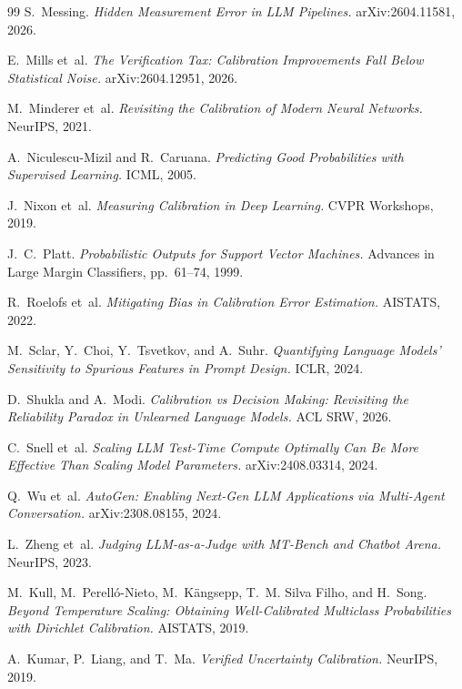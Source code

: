 \documentclass[11pt]{article}
\begin{document}
\begin{thebibliography}{99}
 S.~Messing.
\newblock \textit{Hidden Measurement Error in LLM Pipelines.}
\newblock arXiv:2604.11581, 2026.

 E.~Mills et~al.
\newblock \textit{The Verification Tax: Calibration Improvements Fall Below Statistical Noise.}
\newblock arXiv:2604.12951, 2026.

 M.~Minderer et~al.
\newblock \textit{Revisiting the Calibration of Modern Neural Networks.}
\newblock NeurIPS, 2021.

 A.~Niculescu-Mizil and R.~Caruana.
\newblock \textit{Predicting Good Probabilities with Supervised Learning.}
\newblock ICML, 2005.

 J.~Nixon et~al.
\newblock \textit{Measuring Calibration in Deep Learning.}
\newblock CVPR Workshops, 2019.

 J.~C.~Platt.
\newblock \textit{Probabilistic Outputs for Support Vector Machines.}
\newblock Advances in Large Margin Classifiers, pp.~61--74, 1999.

 R.~Roelofs et~al.
\newblock \textit{Mitigating Bias in Calibration Error Estimation.}
\newblock AISTATS, 2022.

 M.~Sclar, Y.~Choi, Y.~Tsvetkov, and A.~Suhr.
\newblock \textit{Quantifying Language Models' Sensitivity to Spurious Features in Prompt Design.}
\newblock ICLR, 2024.

 D.~Shukla and A.~Modi.
\newblock \textit{Calibration vs Decision Making: Revisiting the Reliability Paradox in Unlearned Language Models.}
\newblock ACL SRW, 2026.

 C.~Snell et~al.
\newblock \textit{Scaling LLM Test-Time Compute Optimally Can Be More Effective Than Scaling Model Parameters.}
\newblock arXiv:2408.03314, 2024.

 Q.~Wu et~al.
\newblock \textit{AutoGen: Enabling Next-Gen LLM Applications via Multi-Agent Conversation.}
\newblock arXiv:2308.08155, 2024.

 L.~Zheng et~al.
\newblock \textit{Judging LLM-as-a-Judge with MT-Bench and Chatbot Arena.}
\newblock NeurIPS, 2023.

 M.~Kull, M.~Perell\'o-Nieto, M.~K\"angsepp, T.~M. Silva Filho, and H.~Song.
\newblock \textit{Beyond Temperature Scaling: Obtaining Well-Calibrated Multiclass Probabilities with Dirichlet Calibration.}
\newblock AISTATS, 2019.

 A.~Kumar, P.~Liang, and T.~Ma.
\newblock \textit{Verified Uncertainty Calibration.}
\newblock NeurIPS, 2019.

\end{thebibliography}
\end{document}
